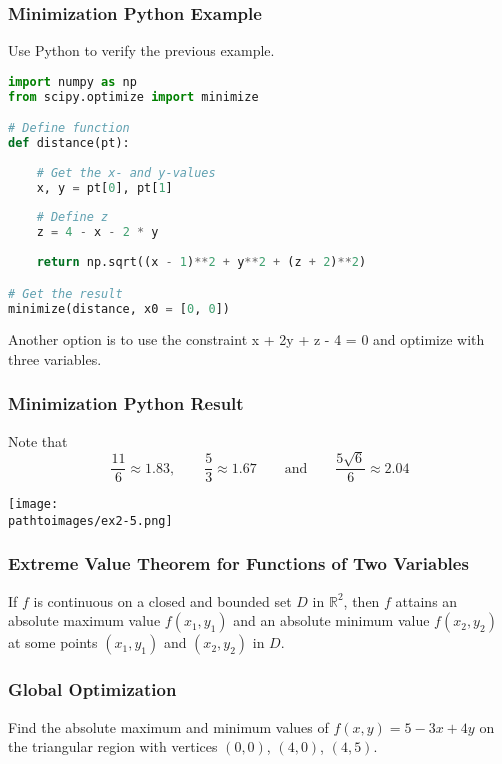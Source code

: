 \documentclass{beamer}
\newcommand{\pathtoimages}{/Users/charlesrambo/Desktop/Bootcamp24/Images}
\begin{document}
\begin{frame}[fragile]
\frametitle{Minimization Python Example}
\small

\begin{Example}
Use Python to verify the previous example.
\end{Example}

\begin{lstlisting}[language=Python]
import numpy as np
from scipy.optimize import minimize

# Define function
def distance(pt):
    
    # Get the x- and y-values
    x, y = pt[0], pt[1]
    
    # Define z 
    z = 4 - x - 2 * y
    
    return np.sqrt((x - 1)**2 + y**2 + (z + 2)**2)

# Get the result   
minimize(distance, x0 = [0, 0]) 
\end{lstlisting}
Another option is to use the constraint x + 2y + z - 4 = 0 and optimize with three variables.
\end{frame}

\begin{frame}
\frametitle{Minimization Python Result}
Note that
$$
\frac{11}{6} \approx 1.83,\qquad \frac{5}{3} \approx 1.67\qquad\text{and}\qquad \frac{5\sqrt{6}}{6}\approx 2.04
$$
\begin{center}
\texttt{[image: \\pathtoimages/ex2-5.png]}
\end{center}
\end{frame}

\begin{frame}
\frametitle{Extreme Value Theorem for Functions of Two Variables}
\begin{Theorem}
If $f$ is continuous on a closed and bounded set $D$ in $\mathbb{R}^2$, then $f$ attains an absolute maximum value $f(x_1, y_1)$ and an absolute minimum value $f(x_2, y_2)$ at some points $(x_1, y_1)$ and $(x_2, y_2)$ in $D$.
\end{Theorem}
\end{frame}

\begin{frame}[t]
\frametitle{Global Optimization}
\begin{Example}
Find the absolute maximum and minimum values of $f(x, y) = 5 - 3x + 4y$ on the triangular region with vertices $(0, 0)$, $(4, 0)$, $(4, 5)$.
\end{Example}
\end{frame}
\end{document}
